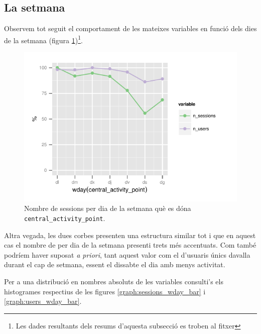 \documentclass[
	a4paper,
	twoside,
	justified
]{tufte-book}
\begin{document}
\subsection{La setmana}

Observem tot seguit el comportament de les mateixes variables en funció dels dies de la setmana (figura \ref{graph:student_session_wday_scatter})\footnote{Les dades resultants dels resums d'aquesta subsecció es troben al fitxer }.

\begin{figure}
\begin{center}
\includegraphics{student_session_wday_scatter}
\caption{
	\label{graph:student_session_wday_scatter}
	Nombre de sessions per dia de la setmana què es dóna \texttt{central\_activity\_point}. 
}
\end{center}
\end{figure}  

Altra vegada, les dues corbes presenten una estructura similar tot i que en aquest cas el nombre de per dia de la setmana presenti trets més accentuats. Com també podríem haver suposat \emph{a priori}, tant aquest valor com el d'usuaris únics davalla durant el cap de setmana, essent el dissabte el dia amb menys activitat. 

Per a una distribució en nombres absoluts de les variables consulti's els histogrames respectius de les figures \ref{graph:sessions_wday_bar} i \ref{graph:users_wday_bar}.
\end{document}
